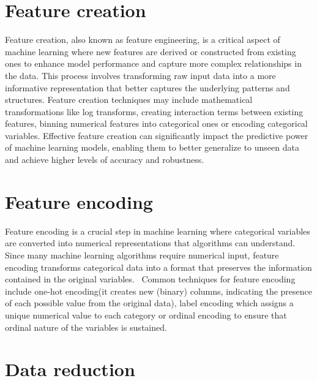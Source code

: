\documentclass[
]{book}
\begin{document}
\hypertarget{feature-creation}{%
\section{\texorpdfstring{Feature creation\\
}{Feature creation }}\label{feature-creation}}

Feature creation, also known as feature engineering, is a critical aspect of machine learning where new features are derived or constructed from existing ones to enhance model performance and capture more complex relationships in the data. This process involves transforming raw input data into a more informative representation that better captures the underlying patterns and structures. Feature creation techniques may include mathematical transformations like log transforms, creating interaction terms between existing features, binning numerical features into categorical ones or encoding categorical variables. Effective feature creation can significantly impact the predictive power of machine learning models, enabling them to better generalize to unseen data and achieve higher levels of accuracy and robustness.

\hypertarget{feature-encoding}{%
\section{\texorpdfstring{Feature encoding\\
}{Feature encoding }}\label{feature-encoding}}

Feature encoding is a crucial step in machine learning where categorical variables are converted into numerical representations that algorithms can understand. Since many machine learning algorithms require numerical input, feature encoding transforms categorical data into a format that preserves the information contained in the original variables.~
Common techniques for feature encoding include one-hot encoding(it creates new (binary) columns, indicating the presence of each possible value from the original data), label encoding which assigns a unique numerical value to each category or ordinal encoding to ensure that ordinal nature of the variables is sustained.

\hypertarget{data-reduction}{%
\section{\texorpdfstring{Data reduction\\
}{Data reduction }}\label{data-reduction}}
\end{document}
